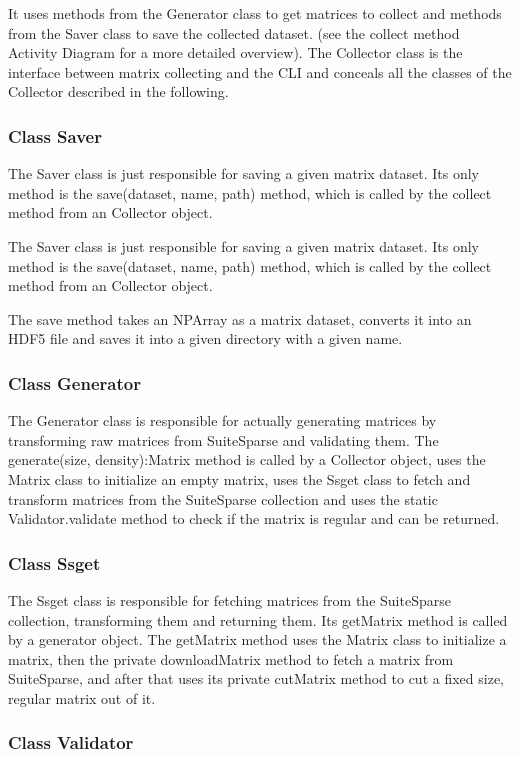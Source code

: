 \documentclass[parskip=full]{scrartcl}
\begin{document}
It uses methods from the Generator class to get matrices to collect and methods from the Saver class to save the collected dataset.
(see the collect method Activity Diagram for a more detailed overview).
The Collector class is the interface between matrix collecting and the CLI and conceals all the classes of the Collector described in the following.

\subsubsection{Class Saver}

The Saver class is just responsible for saving a given matrix dataset.
Its only method is the save(dataset, name, path) method, which
is called by the collect method from an Collector object.

The Saver class is just responsible for saving a given matrix dataset. Its only method is the save(dataset, name, path) method, which
is called by the collect method from an Collector object.

The save method takes an NPArray as a matrix dataset, converts it into an HDF5 file and saves it into a given directory with a given name.

\subsubsection{Class Generator}
The Generator class is responsible for actually generating matrices by transforming raw matrices from SuiteSparse and validating them.
The generate(size, density):Matrix method is called by a Collector object, uses the Matrix class to initialize an empty matrix, uses the Ssget class to fetch and transform matrices from the SuiteSparse collection and uses the static Validator.validate method to check if the matrix is regular and can be returned.

\subsubsection{Class Ssget}
The Ssget class is responsible for fetching matrices from the SuiteSparse collection, transforming them and returning them.
Its getMatrix method is called by a generator object.
The getMatrix method uses the Matrix class to initialize a matrix, then the private downloadMatrix method to fetch a matrix from SuiteSparse, and after that uses its private cutMatrix method to cut a fixed size, regular matrix out of it.

\subsubsection{Class Validator}
\end{document}
